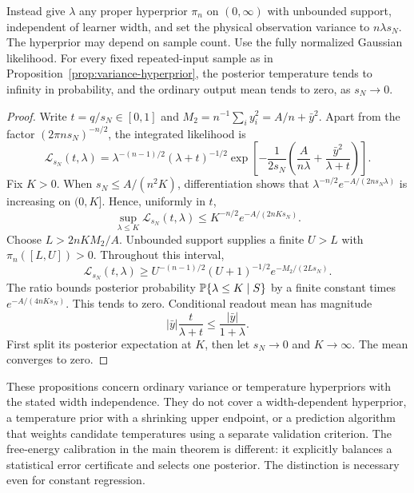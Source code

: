 \begin{proposition}
\label{prop:temperature-hyperprior}
Instead give $\lambda$ any proper hyperprior $\pi_n$ on $(0,\infty)$ with unbounded support, independent of learner width, and set the physical observation variance to $n\lambda s_N$. The hyperprior may depend on sample count. Use the fully normalized Gaussian likelihood. For every fixed repeated-input sample as in Proposition~\ref{prop:variance-hyperprior}, the posterior temperature tends to infinity in probability, and the ordinary output mean tends to zero, as $s_N\to0$.
\end{proposition}
\begin{proof}
Write $t=q/s_N\in[0,1]$ and $M_2=n^{-1}\sum_i y_i^2=A/n+\bar y^2$. Apart from the factor $(2\pi ns_N)^{-n/2}$, the integrated likelihood is
\[
 \mathcal L_{s_N}(t,\lambda)=\lambda^{-(n-1)/2}(\lambda+t)^{-1/2}
 \exp\left[-\frac1{2s_N}\left(\frac A{n\lambda}+
                                      \frac{\bar y^2}{\lambda+t}\right)\right].
\]
Fix $K>0$. When $s_N\le A/(n^2K)$, differentiation shows that
$\lambda^{-n/2}e^{-A/(2ns_N\lambda)}$ is increasing on $(0,K]$. Hence, uniformly in $t$,
\[
 \sup_{\lambda\le K}\mathcal L_{s_N}(t,\lambda)
 \le K^{-n/2}e^{-A/(2nKs_N)}.
\]
Choose $L>2nKM_2/A$. Unbounded support supplies a finite $U>L$ with $\pi_n([L,U])>0$. Throughout this interval,
\[
 \mathcal L_{s_N}(t,\lambda)
 \ge U^{-(n-1)/2}(U+1)^{-1/2}e^{-M_2/(2Ls_N)}.
\]
The ratio bounds posterior probability $\mathbb P\{\lambda\le K\mid S\}$ by a finite constant times $e^{-A/(4nKs_N)}$. This tends to zero. Conditional readout mean has magnitude
\[
 |\bar y|\frac{t}{\lambda+t}\le\frac{|\bar y|}{1+\lambda}.
\]
First split its posterior expectation at $K$, then let $s_N\to0$ and $K\to\infty$. The mean converges to zero.
\end{proof}

These propositions concern ordinary variance or temperature hyperpriors with the stated width independence. They do not cover a width-dependent hyperprior, a temperature prior with a shrinking upper endpoint, or a prediction algorithm that weights candidate temperatures using a separate validation criterion. The free-energy calibration in the main theorem is different: it explicitly balances a statistical error certificate and selects one posterior. The distinction is necessary even for constant regression.
